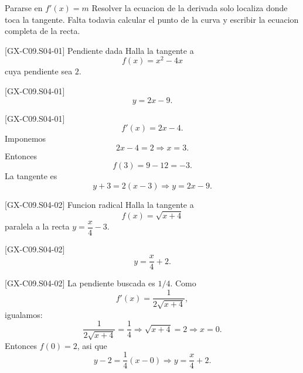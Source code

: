 \begin{commonerror}{Pararse en \(f'(x)=m\)}
Resolver la ecuacion de la derivada solo localiza donde toca la tangente. Falta todavia
calcular el punto de la curva y escribir la ecuacion completa de la recta.
\end{commonerror}

\begin{guidedexercise}{[GX-C09.S04-01] Pendiente dada}
Halla la tangente a
\[
f(x)=x^2-4x
\]
cuya pendiente sea \(2\).
\end{guidedexercise}

\begin{shortanswer}{[GX-C09.S04-01]}
\[
y=2x-9.
\]
\end{shortanswer}

\begin{fullsolution}{[GX-C09.S04-01]}
\[
f'(x)=2x-4.
\]
Imponemos
\[
2x-4=2 \Longrightarrow x=3.
\]
Entonces
\[
f(3)=9-12=-3.
\]
La tangente es
\[
y+3=2(x-3)\Longrightarrow y=2x-9.
\]
\end{fullsolution}

\begin{guidedexercise}{[GX-C09.S04-02] Funcion radical}
Halla la tangente a
\[
f(x)=\sqrt{x+4}
\]
paralela a la recta \(y=\dfrac{x}{4}-3\).
\end{guidedexercise}

\begin{shortanswer}{[GX-C09.S04-02]}
\[
y=\frac{x}{4}+2.
\]
\end{shortanswer}

\begin{fullsolution}{[GX-C09.S04-02]}
La pendiente buscada es \(1/4\). Como
\[
f'(x)=\frac{1}{2\sqrt{x+4}},
\]
igualamos:
\[
\frac{1}{2\sqrt{x+4}}=\frac{1}{4}\Longrightarrow \sqrt{x+4}=2 \Longrightarrow x=0.
\]
Entonces \(f(0)=2\), asi que
\[
y-2=\frac{1}{4}(x-0)\Longrightarrow y=\frac{x}{4}+2.
\]
\end{fullsolution}

